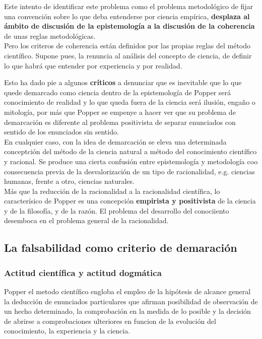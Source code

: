 \documentclass[a4paper, 11pt, twocolumn, spanish]{article}
\begin{document}
Este intento de identificar este problema como el problema
metodológico de fijar una convención sobre lo que deba entenderse por
ciencia empírica, \textbf{desplaza al ámbito de discusión de la epistemología
a la discusión de la coherencia} de unas reglas metodológicas.\\
Pero los criteros de coherencia están definidos por las propias reglas
del método científico. Supone pues, la renuncia al análisis del
concepto de ciencia, de definir lo que habrá que entender por
experiencia y por realidad.

Esto ha dado pie a algunos \textbf{críticos} a denunciar que es inevitable
que lo que quede demarcado como ciencia dentro de la epistemología de
Popper será conocimiento de realidad y lo que queda fuera de la
ciencia será ilusión, engaño o mitología, por más que Popper se
empenye a hacer ver que su problema de demarcación es diferente al
problema positivista de separar enunciados con sentido de los
enunciados sin sentido.\\

En cualquier caso, con la idea de demarcación se eleva una determinada
conceptción del método de la ciencia natural a método del conocimiento
científico y racional. Se produce una cierta confusión entre
epistemología y metodología coo consecuencia previa de la
desvalorización de un tipo de racionalidad, e.g. ciencias humanas,
frente a otro, ciencias naturales.\\
Más que la reducción de la racionalidad a la racionalidad científica,
lo caracterísico de Popper es una concepción \textbf{empirista y positivista}
de la ciencia y de la filosofía, y de la razón. El problema del
desarrollo del conociiento desemboca en el problema general de la
racionalidad.

\subsection{La falsabilidad como criterio de demaración}
\label{sec:org29ebdde}

\subsubsection{Actitud científica y actitud dogmática}
\label{sec:org011f9c6}
Popper el metodo científico engloba el empleo de la hipótesis de
alcance general la deducción de enunciados particulares que afirman
posibilidad de observación de un hecho determinado, la comprobación en
la medida de lo posible y la decisión de abrirse a comprobaciones
ulteriores en funcion de la evolución del conocimiento, la experiencia
y la ciencia.\\
\end{document}
